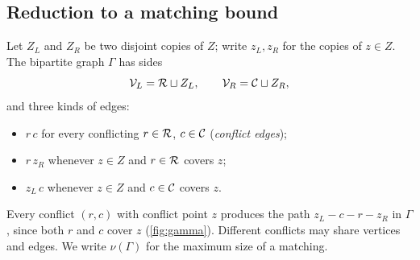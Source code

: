 \subsection{Reduction to a matching bound}\label{sec:gamma}

\begin{definition}\label{def:gamma}
Let $Z_L$ and $Z_R$ be two disjoint copies of $Z$; write $z_L,z_R$ for the
copies of $z\in Z$. The bipartite graph $\Gamma$ has sides
\[
 \mathcal V_L=\mathcal R\sqcup Z_L,\qquad \mathcal V_R=\mathcal C\sqcup Z_R,
\]
and three kinds of edges:
\begin{itemize}
\item[(E1)] $r\,c$ for every conflicting $r\in\mathcal R$, $c\in\mathcal C$ (\emph{conflict edges});
\item[(E2)] $r\,z_R$ whenever $z\in Z$ and $r\in\mathcal R$ covers $z$;
\item[(E3)] $z_L\,c$ whenever $z\in Z$ and $c\in\mathcal C$ covers $z$.
\end{itemize}
\end{definition}

Every conflict $(r,c)$ with conflict point $z$ produces the path
$z_L - c - r - z_R$ in $\Gamma$, since both $r$ and $c$ cover $z$
(\cref{fig:gamma}). Different conflicts may share vertices and edges. We
write $\nu(\Gamma)$ for the maximum size of a matching.

